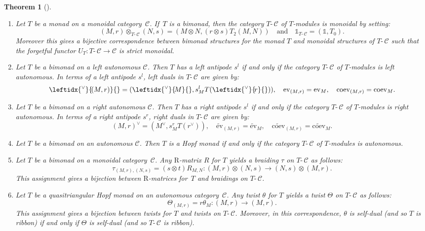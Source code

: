 \documentclass[a4paper]{amsart}
\newtheorem{thm}{Theorem}[section]
\theoremstyle{definition}
\newcommand{\co}{\colon}
\newcommand{\cc}{\mathcal{C}}
\newcommand{\Rt}{$\mathrm{R}$\nobreakdash-\hspace{0pt}}
\newcommand{\ti}{\mbox{-}\,}
\newcommand{\un}{\mathbb{1}}
\newcommand{\lev}{\mathrm{ev}}
\newcommand{\rev}{\widetilde{\mathrm{ev}}}
\newcommand{\lcoev}{\mathrm{coev}}
\newcommand{\rcoev}{\widetilde{\mathrm{coev}}}
\newcommand{\ldual}[1]{\leftidx{^\vee}{\!#1}{}}
\newcommand{\rdual}[1]{{#1}^\vee}
\begin{document}
\begin{thm}[\cite{BV2}]\label{thm-biHopfmon}
 \begin{enumerate}
  \renewcommand{\labelenumi}{{\rm (\alph{enumi})}}
\item Let $T$ be a monad on a monoidal category~$\cc$. If~$T$ is a bimonad, then the category $T\ti\cc$ of $T$-modules is
monoidal by setting:
\begin{equation*}
(M,r) \otimes_{T\ti\cc} (N,s)=(M \otimes N, (r \otimes s) T_2(M,N)) \quad \text{and} \quad \un_{T\ti\cc}=(\un,T_0).
\end{equation*}
Moreover this gives a bijective correspondence between bimonad structures for the monad $T$ and  monoidal structures of
$T\ti\cc$ such that the forgetful functor $U_T \co T\ti\cc \to \cc$ is strict monoidal.
  \item Let $T$ be a bimonad on a left autonomous $\cc$. Then $T$ has a left antipode $s^l$ if and only if
     the category $T\ti\cc$ of $T$-modules is
    left autonomous. In terms of a left antipode $s^l$, left duals in
$T\ti\cc$ are given by:
\begin{equation*}
\ldual{(M,r)}=(\ldual{M}, s^l_M T(\ldual{r})),\quad \lev_{(M,r)}=\lev_M, \quad\lcoev_{(M,r)}=\lcoev_M.
\end{equation*}
  \item Let $T$ be a bimonad on a right autonomous $\cc$. Then $T$ has a right antipode $s^l$ if and only if
   the category $T\ti\cc$ of $T$-modules is right autonomous. In terms of a right antipode $s^r$, right duals
in $T\ti\cc$ are given by:
\begin{equation*}
\rdual{(M,r)}=(\rdual{M}, s^r_M T(\rdual{r})),\quad \rev_{(M,r)}=\rev_M, \quad\rcoev_{(M,r)}=\rcoev_M.
\end{equation*}
\item Let $T$ be a bimonad on an autonomous $\cc$. Then $T$ is a Hopf monad if and only if
   the category $T\ti\cc$ of $T$-modules is autonomous.
\item Let $T$ be a bimonad on a monoidal category~$\cc$. Any \Rt matrix $R$ for $T$ yields a braiding $\tau$ on $T\ti\cc$ as
follows:
\begin{equation*}
\tau_{(M,r),(N,s)}=(s \otimes t)R_{M,N}\co (M,r) \otimes (N,s) \to (N,s) \otimes (M,r).
\end{equation*}
This assignment gives a bijection between \Rt matrices for~$T$ and braidings on $T\ti\cc$.
\item Let $T$ be a quasitriangular Hopf monad on an autonomous category~$\cc$. Any twist $\theta$ for $T$ yields a twist $\Theta$
on $T\ti\cc$ as follows:
\begin{equation*}
\Theta_{(M,r)}=r \theta_M\co (M,r) \to (M,r).
\end{equation*}
This assignment gives a bijection between twists for $T$ and twists on $T\ti\cc$. Moreover, in this correspondence, $\theta$
is self-dual (and so $T$ is ribbon) if and only if $\Theta$ is self-dual (and so $T\ti\cc$ is ribbon).
\end{enumerate}
\end{thm}
\end{document}
